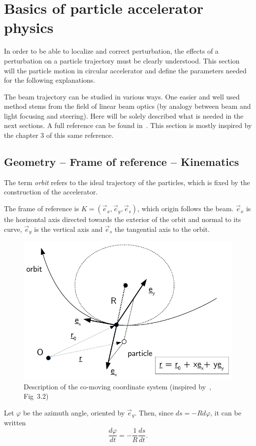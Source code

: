 
\chapter{Basics of particle accelerator physics}
\label{sec:acc_physics}
In order to be able to localize and correct perturbation, the effects of a perturbation on a particle trajectory must be clearly understood. This section will the particle motion in circular accelerator and define the parameters needed for the following explanations.

The beam trajectory can be studied in various ways. One easier and well used method stems from the field of linear beam optics (by analogy between beam and light focusing and steering). Here will be solely described what is needed in the next sections. A full reference can be found in~\cite{book:wille}. This section is mostly inspired by the chapter 3 of this same reference.

\section{Geometry -- Frame of reference -- Kinematics}
The term \emph{orbit} refers to the ideal trajectory of the particles, which is fixed by the construction of the accelerator.

The frame of reference is $K=(\vec{e}_x,\vec{e}_y, \vec{e}_s)$, which origin follows the beam. $\vec{e}_x$ is the horizontal axis directed towards the exterior of the orbit and normal to its curve, $\vec{e}_y$ is the vertical axis and $\vec{e}_s$ the tangential axis to the orbit.
\begin{figure}
    \centering
    \includegraphics[width=0.8\linewidth]{img/orbit_coordinates.pdf}
    \caption[Description of the co-moving coordinate system]{\label{fig:coordinate system}Description of the co-moving coordinate system (inspired by~\cite{book:wille}, Fig~3.2)}
\end{figure}
Let $\varphi$ be the azimuth angle, oriented by $\vec{e}_y$. Then, since $ds = -R d\varphi$, it can be written
\begin{equation}
\frac{d \varphi}{d t}  = -\frac{1}{R} \frac{d s}{d t}.
\end{equation}

